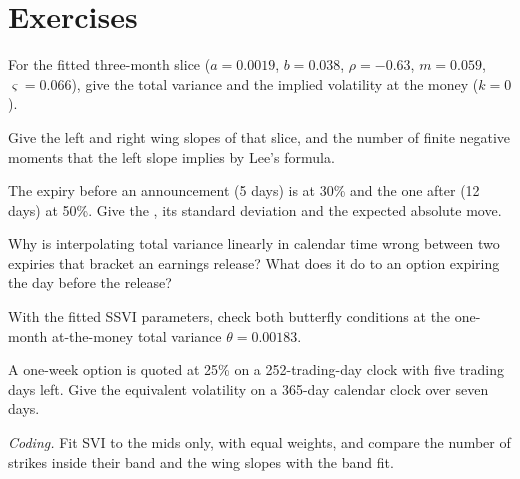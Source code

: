 \section{Exercises}

\begin{exercise}[$\star$]\label{exo:dv:parametrising-the-surface:1}
For the fitted three-month slice ($a=0.0019$, $b=0.038$, $\rho=-0.63$, $m=0.059$, $\varsigma=0.066$),
give the total variance and the implied volatility at the money ($k=0$).
\end{exercise}

\begin{exercise}[$\star$]\label{exo:dv:parametrising-the-surface:2}
Give the left and right wing slopes of that slice, and the number of finite negative moments that
the left slope implies by Lee's formula.
\end{exercise}

\begin{exercise}[$\star$]\label{exo:dv:parametrising-the-surface:3}
The expiry before an announcement (5 days) is at 30\% and the one after (12 days) at 50\%. Give the , its standard deviation and the expected absolute move.
\end{exercise}

\begin{exercise}[$\star\star$]\label{exo:dv:parametrising-the-surface:4}
Why is interpolating total variance linearly in calendar time wrong between two expiries that bracket
an earnings release? What does it do to an option expiring the day before the release?
\end{exercise}

\begin{exercise}[$\star\star$]\label{exo:dv:parametrising-the-surface:5}
With the fitted SSVI parameters, check both butterfly conditions at the one-month at-the-money total
variance $\theta=0.00183$.
\end{exercise}

\begin{exercise}[$\star\star$]\label{exo:dv:parametrising-the-surface:6}
A one-week option is quoted at 25\% on a 252-trading-day clock with five trading days left. Give the
equivalent volatility on a 365-day calendar clock over seven days.
\end{exercise}

\begin{exercise}[$\star\star\star$]\label{exo:dv:parametrising-the-surface:7}
\emph{Coding.} Fit SVI to the mids only, with equal weights, and compare the number of strikes inside
their band and the wing slopes with the band fit.
\end{exercise}

